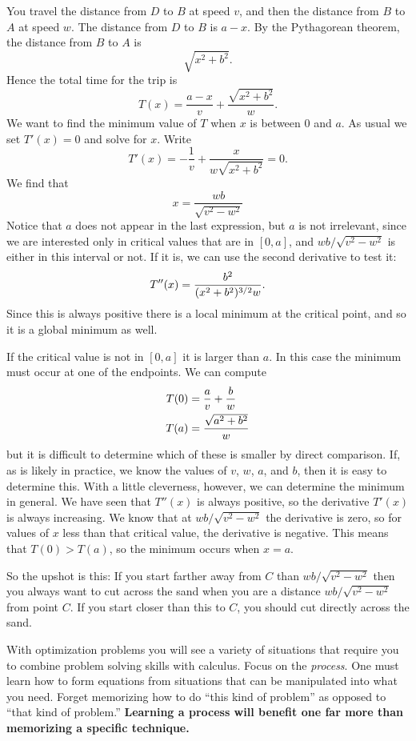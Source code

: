\documentclass{ximera}
\begin{document}
\begin{example}
\begin{explanation}
    You travel the distance from $D$ to $B$ at speed $v$, and then the
    distance from $B$ to $A$ at speed $w$.  The distance from $D$ to $B$
    is $a-x$. By the Pythagorean theorem, the distance from $B$ to $A$
    is
    \[
    \sqrt{x^2+b^2}.
    \] 
Hence the total time for the trip is
\[
T(x)=\frac{a-x}{v}+\frac{\sqrt{x^2+b^2}}{w}.
\]
We want to find the minimum value of $T$ when $x$ is between 0 and
$a$.  As usual we set $T'(x)=0$ and solve for $x$. Write
\[
  T'(x)=-\frac{1}{v}+\frac{x}{w\sqrt{x^2+b^2}} =0.
\]
We find that 
\[
x=\frac{wb}{\sqrt{v^2-w^2}}
\]
Notice that $a$ does not appear in the last expression, but $a$ is not
irrelevant, since we are interested only in critical values that are
in $[0,a]$, and $wb/\sqrt{v^2-w^2}$ is either in this interval or not.
If it is, we can use the second derivative to test it:
\[
T''(x) = {b^2\over (x^2+b^2)^{3/2}w}.
\]
Since this is always positive there is a local minimum at the critical
point, and so it is a global minimum as well.

If the critical value is not in $[0,a]$ it is larger than $a$. In this
case the minimum must occur at one of the endpoints. We can compute
\begin{align*}
T(0)&={a\over v}+{b\over w} \\
T(a)&={\sqrt{a^2+b^2}\over w} 
\end{align*}
but it is difficult to determine which of these is smaller by direct
comparison. If, as is likely in practice, we know the values of $v$,
$w$, $a$, and $b$, then it is easy to determine this. With a little
cleverness, however, we can determine the minimum in general. We have seen that
$T''(x)$ is always positive, so the derivative $T'(x)$ is always increasing.
We know that at $wb/\sqrt{v^2-w^2}$ the derivative is zero, so for
values of $x$ less than that critical value, the derivative is
negative. This means that $T(0)>T(a)$, so the minimum occurs when $x=a$.

So the upshot is this: If you start farther away from $C$ than
$wb/\sqrt{v^2-w^2}$ then you always want to cut across the sand 
when you are a distance $wb/\sqrt{v^2-w^2}$ from point $C$. If you
start closer than this to $C$, you should cut directly across the sand.
\end{explanation}
\end{example}


With optimization problems you will see a variety of situations that
require you to combine problem solving skills with calculus. Focus on
the \textit{process}.  One must learn how to form equations from
situations that can be manipulated into what you need. Forget
memorizing how to do ``this kind of problem'' as opposed to ``that
kind of problem.''  \textbf{Learning a process will benefit one far more
than memorizing a specific technique.}
\end{document}
